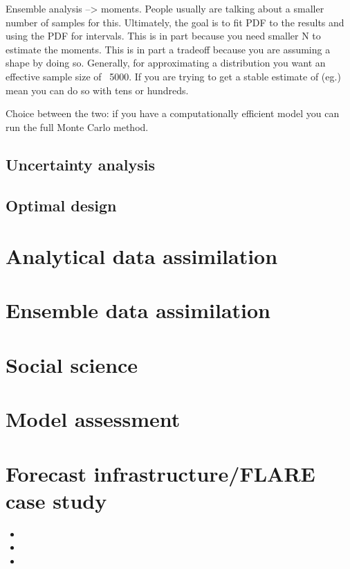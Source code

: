 \documentclass[12pt, oneside]{article}   	%
\begin{document}
Ensemble analysis --> moments. People usually are talking about a smaller number of samples for this. Ultimately, the goal is to fit PDF to the results and using the PDF for intervals. This is in part because you need smaller N to estimate the moments. This is in part a tradeoff because you are assuming a shape by doing so. Generally, for approximating a distribution you want an effective sample size of ~5000. If you are trying to get a stable estimate of (eg.) mean you can do so with tens or hundreds.

Choice between the two: if you have a computationally efficient model you can run the full Monte Carlo method.



\subsection{Uncertainty analysis}

\subsection{Optimal design}


\section{Analytical data assimilation}

\section{Ensemble data assimilation}

\section{Social science}

\section{Model assessment}

\section{Forecast infrastructure/FLARE case study}


\begin{itemize}
\item 

\item 

\item 

\end{itemize}
\end{document}
